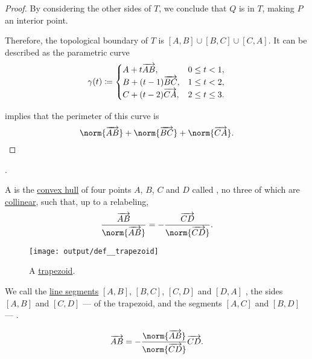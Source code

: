 \begin{proof}
  By considering the other sides of \( T \), we conclude that \( Q \) is in \( T \), making \( P \) an interior point.

  Therefore, the topological boundary of \( T \) is \( [A, B] \cup [B, C] \cup [C, A] \). It can be described as the parametric curve
  \begin{equation*}
    \gamma(t) \coloneqq \begin{cases}
      A + t \overrightarrow{AB},       &0 \leq t < 1, \\
      B + (t - 1) \overrightarrow{BC}, &1 \leq t < 2, \\
      C + (t - 2) \overrightarrow{CA}, &2 \leq t \leq 3.
    \end{cases}
  \end{equation*}

   implies that the perimeter of this curve is
  \begin{equation*}
    \norm{\vect{AB}} + \norm{\vect{BC}} + \norm{\vect{CA}}.
  \end{equation*}
\end{proof}

\begin{definition}\label{def:quadrilateral}
  .
\end{definition}

\begin{definition}\label{def:trapezoid}\mimprovised
  A  is the \hyperref[def:convex_hull]{convex hull} of four points \( A \), \( B \), \( C \) and \( D \) called , no three of which are \hyperref[def:collinear_points]{collinear}, such that, up to a relabeling,
  \begin{equation*}
    \frac {\vect{AB}} {\norm{\vect{AB}}} = -\frac {\vect{CD}} {\norm{\vect{CD}}}.
  \end{equation*}

  \begin{figure}[!ht]
    \centering
    \texttt{[image: output/def\_\_trapezoid]}
    \caption{A \hyperref[def:trapezoid]{trapezoid}.}\label{fig:def:trapezoid}
  \end{figure}

  We call the \hyperref[def:line_segment]{line segments} \( [A, B] \), \( [B, C] \), \( [C, D] \) and \( [D, A] \) , the sides \( [A, B] \) and \( [C, D] \) ---  of the trapezoid, and the segments \( [A, C] \) and \( [B, D] \) --- .

  \begin{equation*}
    \vect{AB} = -\frac {\norm{\vect{AB}}} {\norm{\vect{CD}}} \vect{CD}.
  \end{equation*}
\end{definition}


